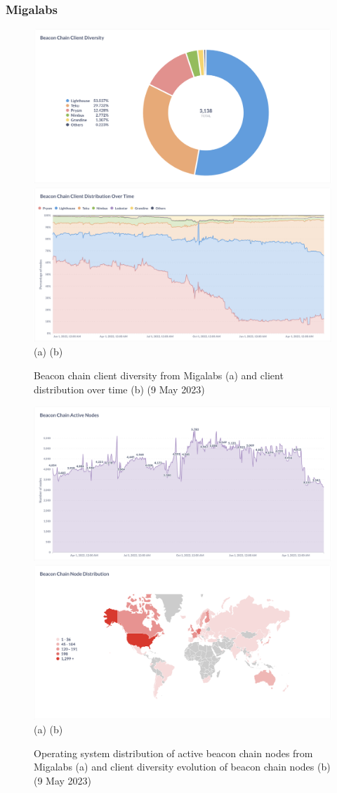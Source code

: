 \documentclass[UTF8]{article}
\begin{document}
\subsubsection*{Migalabs}
 \begin{figure}[htbp]
\begin{center}
\includegraphics[width=0.48\linewidth]{images/clientdiversity}
\includegraphics[width=0.48\linewidth]{images/architecture} \\
(a)\hspace{160pt}        (b)\\
\caption{Beacon chain client diversity from Migalabs (a) and client distribution over time (b) (9 May 2023)}
\label{fig:diversity}
\end{center}
\end{figure}

\begin{figure}[htbp]
\begin{center}
\includegraphics[width=0.48\linewidth]{images/activenodes}
\includegraphics[width=0.48\linewidth]{images/evolution} \\
(a)\hspace{160pt}        (b)\\
\caption{Operating system distribution of active beacon chain nodes from Migalabs (a) and client diversity evolution of beacon chain nodes (b) (9 May 2023)}
\label{fig:active}
\end{center}
\end{figure}
\end{document}
